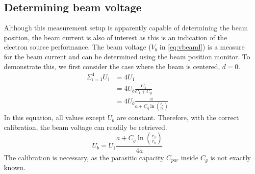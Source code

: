\subsection{Determining beam voltage}
Although this measurement setup is apparently capable of determining the beam position, the beam current is also of interest as this is an indication of the electron source performance.
The beam voltage ($V_b$ in \ref{eq:vbeamI}) is a measure for the beam current and can be determined using the beam position monitor. To demonstrate this, we first consider the case where the beam is centered, $d=0$.
\begin{align}
\Sigma_{i=1}^4 U_i &= 4U_1 \nonumber\\
&= 4U_b\frac{C_1}{C_1+C_g} \nonumber\\
&= 4U_b\frac{a}{a+C_g\ln\left(\frac{r_s}{r_b}\right)}
\end{align}
In this equation, all values except $U_b$ are constant. Therefore, with the correct calibration, the beam voltage can readily be retrieved.
\begin{equation}
U_b =U_1\frac{a+C_g\ln\left(\frac{r_s}{r_b}\right)}{4a} \label{eq:beamvoltagemeas}
\end{equation}
The calibration is necessary, as the parasitic capacity $C_{par}$ inside $C_g$ is not exactly known.

